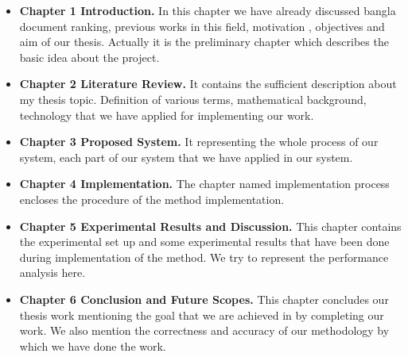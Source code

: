 \begin{itemize}

\item \textbf{Chapter 1 Introduction.} In this chapter we have already discussed bangla document ranking, previous works in this field, motivation , objectives and aim of our thesis. Actually it is the preliminary chapter which describes the basic idea about the project. 

\item \textbf{Chapter 2 Literature Review.} It contains the sufficient description about my thesis topic. Definition of various terms, mathematical background, technology that we have applied for implementing our work. 

\item \textbf{Chapter 3 Proposed System.} It representing the whole process of our system, each part of our system that we have applied in our system.  

\item \textbf{Chapter 4 Implementation.} The chapter named implementation process encloses  the  procedure  of  the  method  implementation.

\item \textbf{Chapter 5 Experimental Results and Discussion.} This chapter contains the experimental set up and some experimental results that have been done during implementation of the method. We try to represent the performance analysis here.

\item \textbf{Chapter 6 Conclusion and Future Scopes.} This chapter concludes our thesis work mentioning the goal that we are achieved in by completing our work. We also mention the correctness and accuracy of our methodology by which we have done the work.

\end{itemize} 
%
